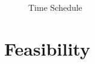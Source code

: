 \documentclass{article}
\begin{document}
\begin{figure} [t]
    \centering
    \vspace{-2.5cm}
    \caption{Time Schedule}
    \label{fig:time_schedule}
\end{figure}

\section{Feasibility}
\newpage
\printbibliography
\end{document}
